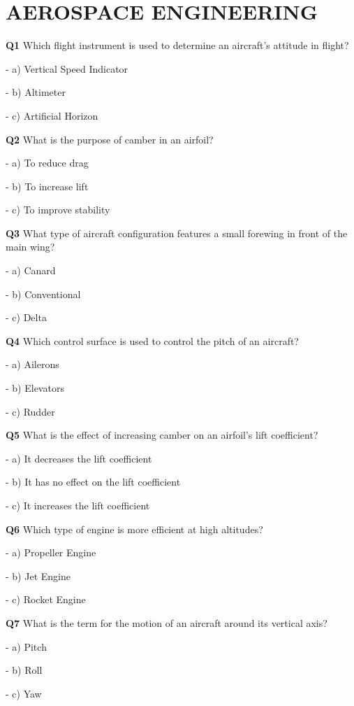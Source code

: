 \section{AEROSPACE ENGINEERING}

\textbf{Q1} Which flight instrument is used to determine an aircraft's attitude in flight?\par
\quad - a) Vertical Speed Indicator\par
\quad - b) Altimeter\par
\quad - c) Artificial Horizon\par

\textbf{Q2} What is the purpose of camber in an airfoil?\par
\quad - a) To reduce drag\par
\quad - b) To increase lift\par
\quad - c) To improve stability\par

\textbf{Q3} What type of aircraft configuration features a small forewing in front of the main wing?\par
\quad - a) Canard\par
\quad - b) Conventional\par
\quad - c) Delta\par

\textbf{Q4} Which control surface is used to control the pitch of an aircraft?\par
\quad - a) Ailerons\par
\quad - b) Elevators\par
\quad - c) Rudder\par

\textbf{Q5} What is the effect of increasing camber on an airfoil's lift coefficient?\par
\quad - a) It decreases the lift coefficient\par
\quad - b) It has no effect on the lift coefficient\par
\quad - c) It increases the lift coefficient\par

\textbf{Q6} Which type of engine is more efficient at high altitudes?\par
\quad - a) Propeller Engine\par
\quad - b) Jet Engine\par
\quad - c) Rocket Engine\par

\textbf{Q7} What is the term for the motion of an aircraft around its vertical axis?\par
\quad - a) Pitch\par
\quad - b) Roll\par
\quad - c) Yaw\par

